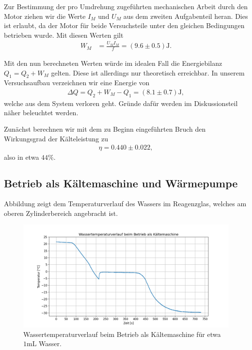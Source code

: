 Zur Bestimmung der pro Umdrehung zugeführten mechanischen Arbeit durch den Motor ziehen wir die Werte $I_M$ und $U_M$ aus dem zweiten Aufgabenteil heran. Dies ist erlaubt, da der Motor für beide Versuchsteile unter den gleichen Bedingungen betrieben wurde. Mit diesen Werten gilt
\begin{align}
    W_M &= \frac{U_M I_M}{f} = (9.6 \pm 0.5) \si{\joule}.
\end{align}

Mit den nun berechneten Werten würde im idealen Fall die Energiebilanz $Q_1 = Q_2 + W_M$ gelten. Diese ist allerdings nur theoretisch erreichbar. In unserem Versuchsaufbau verzeichnen wir eine Energie von 
\begin{align}
    \Delta Q = Q_2 + W_M - Q_1 = (8.1 \pm 0.7) \si{\joule},
\end{align}
welche aus dem System verloren geht. Gründe dafür werden im Diskussionsteil näher beleuchtet werden.

Zunächst berechnen wir mit dem zu Beginn eingeführten Bruch den Wirkungsgrad der Kälteleistung zu
\begin{align}
    \eta = 0.440 \pm 0.022,
\end{align}
also in etwa $44\%$.

\subsection{Betrieb als Kältemaschine und Wärmepumpe}

Abbildung  zeigt dem Temperaturverlauf des Wassers im Reagenzglas, welches am oberen Zylinderbereich angebracht ist.

\begin{figure}[H]
    \centering
    \includegraphics[width=.9\textwidth]{files/tempverlauf_kalt.png}
    \caption{Wassertemperaturverlauf beim Betrieb als Kältemaschine für etwa $1 \si{\milli\liter}$ Wasser.}
    \label{fig:tempverlauf_kalt}
\end{figure}

